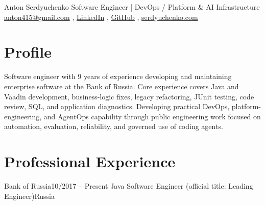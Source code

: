 \documentclass[a4paper,10pt]{article}
\begin{document}
\resumeHeader
  {Anton Serdyuchenko}
  {Software Engineer | DevOps / Platform \& AI Infrastructure}
  {\href{mailto:anton415@gmail.com}{anton415@gmail.com} \sep
   \href{https://www.linkedin.com/in/antonserdyuchenko}{LinkedIn} \sep
   \href{https://github.com/anton415}{GitHub} \sep
   \href{https://serdyuchenko.com}{serdyuchenko.com}}

\section{Profile}
\small
Software engineer with 9 years of experience developing and maintaining enterprise software at the Bank of Russia. Core experience covers Java and Vaadin development, business-logic fixes, legacy refactoring, JUnit testing, code review, SQL, and application diagnostics. Developing practical DevOps, platform-engineering, and AgentOps capability through public engineering work focused on automation, evaluation, reliability, and governed use of coding agents.

\section{Professional Experience}
\resumeSubHeadingListStart
  \resumeSubheading
    {Bank of Russia}{10/2017 -- Present}
    {Java Software Engineer (official title: Leading Engineer)}{Russia}
    \resumeItemListStart
    \resumeItemListEnd
\resumeSubHeadingListEnd
\end{document}

